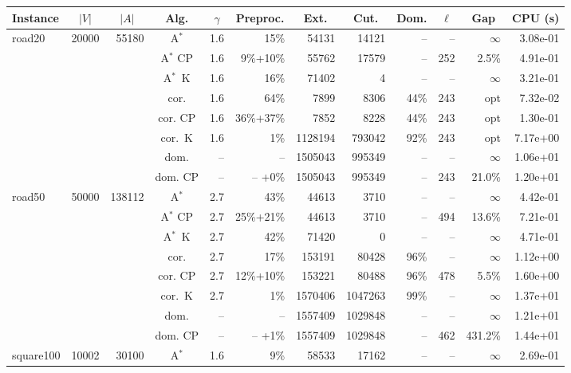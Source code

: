 \documentclass[11pt]{amsart}
\newenvironment{outdent}
{\begin{list}{}{\leftmargin-2cm\rightmargin\leftmargin}\centering\item\relax}
{\end{list}\ignorespacesafterend}
\theoremstyle{plain}
\theoremstyle{remark}
\begin{document}
\begin{table}
\begin{outdent}
\begin{footnotesize}
\begin{tabular}{|l|rrc|rr|rrr|rr|r|}
\hline
Instance 
& \multicolumn{1}{c}{$|V|$} 
& \multicolumn{1}{c}{$|A|$} 
& \multicolumn{1}{c|}{Alg.} 
& \multicolumn{1}{c}{$\gamma$} 
& \multicolumn{1}{c|}{Preproc.} 
& \multicolumn{1}{c}{Ext.} 
& \multicolumn{1}{c}{Cut.} 
& \multicolumn{1}{c|}{Dom.} 
& \multicolumn{1}{c}{$\ell$} 
& \multicolumn{1}{c|}{Gap} 
& \multicolumn{1}{c|}{CPU (s)} \\
\hline
road20 & 20000 & 55180 & A$^*$ & 1.6 & 15\% &54131 & 14121 & -- & -- &$\infty$ & 3.08e-01 \\
&&&A$^*$ CP & 1.6 & 9\%+10\% &55762 & 17579 & -- &252 & 2.5\% & 4.91e-01 \\
&&&A$^*$~K & 1.6 & 16\% &71402 & 4 & -- & -- &$\infty$ & 3.21e-01 \\
&&&cor. & 1.6 & 64\% &7899 & 8306 & 44\% &243 & opt & 7.32e-02 \\
&&&cor. CP & 1.6 & 36\%+37\% &7852 & 8228 & 44\% &243 & opt & 1.30e-01 \\
&&&cor.~K & 1.6 & 1\% &1128194 & 793042 & 92\% &243 & opt & 7.17e+00 \\
&&&dom. & -- & --  &1505043 & 995349 & -- & -- &$\infty$ & 1.06e+01 \\
&&&dom. CP & -- & -- +0\% &1505043 & 995349 & -- &243 & 21.0\% & 1.20e+01 \\
\hline
road50 & 50000 & 138112 & A$^*$ & 2.7 & 43\% &44613 & 3710 & -- & -- &$\infty$ & 4.42e-01 \\
&&&A$^*$ CP & 2.7 & 25\%+21\% &44613 & 3710 & -- &494 & 13.6\% & 7.21e-01 \\
&&&A$^*$~K & 2.7 & 42\% &71420 & 0 & -- & -- &$\infty$ & 4.71e-01 \\
&&&cor. & 2.7 & 17\% &153191 & 80428 & 96\% & -- &$\infty$ & 1.12e+00 \\
&&&cor. CP & 2.7 & 12\%+10\% &153221 & 80488 & 96\% &478 & 5.5\% & 1.60e+00 \\
&&&cor.~K & 2.7 & 1\% &1570406 & 1047263 & 99\% & -- &$\infty$ & 1.37e+01 \\
&&&dom. & -- & --  &1557409 & 1029848 & -- & -- &$\infty$ & 1.21e+01 \\
&&&dom. CP & -- & -- +1\% &1557409 & 1029848 & -- &462 & 431.2\% & 1.44e+01 \\
\hline
square100 & 10002 & 30100 & A$^*$ & 1.6 & 9\% &58533 & 17162 & -- & -- &$\infty$ & 2.69e-01 \\

\end{tabular}
\end{footnotesize}
\end{outdent}
\end{table}
\end{document}
